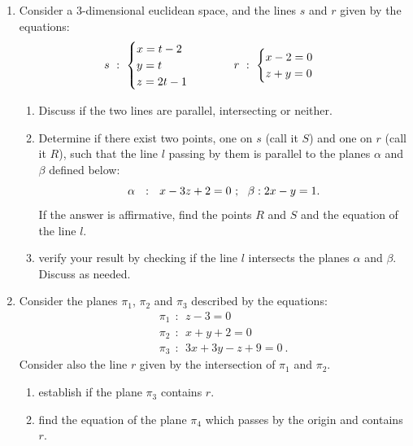 \documentclass[fleqn]{article}
\begin{document}
\begin{enumerate}
  \item  Consider a 3-dimensional euclidean space, and the lines $s$ and $r$ given by the equations: 
    $$
    s~: ~ \begin{cases}
    x = t - 2 \\
    y=t \\ 
    z=2t-1 \\
    \end{cases} \hskip 1truecm r~: ~ \begin{cases}
      x-2=0 \\
      z+y=0 \\
    \end{cases}
    $$
    \begin{enumerate}
    \item Discuss if the two lines are parallel, intersecting or neither. 


    \item Determine if there exist two points, one on $s$ (call it $S$) and one on $r$ (call it $R$), such that the line $l$ passing by them is parallel to the planes $\alpha$ and $\beta$ defined below: 
    $$
    \alpha ~~:~~ x - 3z + 2 = 0 ~;\\
    ~~\beta : 2x - y = 1.
    $$
    If the answer is affirmative, find the points $R$ and $S$  and the equation of the line $l$. 

    \item verify your result by checking if the line $l$  intersects the planes $\alpha$ and $\beta$.  Discuss as needed. 
    \end{enumerate}

  \item Consider the planes $\pi_1$, $\pi_2$ and $\pi_3$ described by the equations: 
    \begin{eqnarray}
    &&\pi_1 ~~ :~~ z-3=0 \nonumber \\
    &&\pi_2 ~~ :~~ x+y+2=0 \nonumber \\
    &&\pi_3 ~~ :~~ 3x+3y-z+9=0 ~.\nonumber 
    \end{eqnarray}
    Consider also the line $r$ given by the intersection of $\pi_1$ and $\pi_2$. 
    \begin{enumerate}

    \item establish if the plane $\pi_3$ contains $r$. 

    \item  find the equation of the plane $\pi_4$ which passes by the origin and contains $r$. 


\end{enumerate}
\end{enumerate}
\end{document}
